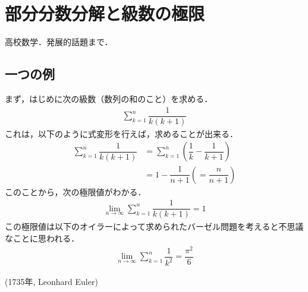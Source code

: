 \documentclass[12pt]{jsarticle}
\date{}
\begin{document}

\section*{部分分数分解と級数の極限}
高校数学．発展的話題まで．
\subsection*{一つの例}
まず，はじめに次の級数（数列の和のこと）を求める．
\begin{align*}
\sum_{k=1}^{n} \dfrac{1}{k(k+1)}
\end{align*}
これは，以下のように式変形を行えば，求めることが出来る．
\begin{align*}
\sum_{k=1}^{n} \dfrac{1}{k(k+1)} &= \sum_{k=1}^{n} \left( \dfrac{1}{k} - \dfrac{1}{k+1} \right) \\
&=1 - \dfrac{1}{n+1} \left( = \dfrac{n}{n+1} \right)
\end{align*}
このことから，次の極限値がわかる．
\begin{align*}
\lim_{n \to \infty} \sum_{k=1}^{n} \dfrac{1}{k(k+1)} = 1
\end{align*}
この極限値は以下のオイラーによって求められたバーゼル問題を考えると不思議なことに思われる．
\begin{align*}
\lim_{n \to \infty} \sum_{k=1}^{n} \dfrac{1}{k^2} = \dfrac{\pi^2}{6}
\end{align*}
\begin{flushright}
(1735{\mbox{年}}, Leonhard Euler)
\end{flushright}
\end{document}
